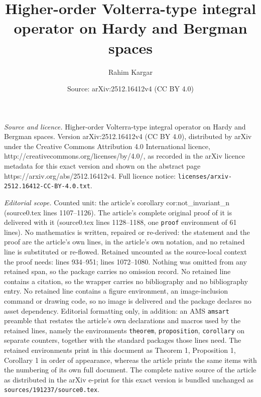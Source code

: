 \documentclass[10pt,a4paper]{amsart}
\title{Higher-order Volterra-type integral operator on Hardy and Bergman spaces}
\author{Rahim Kargar}
\date{Source: arXiv:2512.16412v4 (CC BY 4.0)}
\begin{document}
\maketitle

\noindent\emph{Source and licence.} Higher-order Volterra-type integral operator on Hardy and Bergman spaces. Version arXiv:2512.16412v4 (CC BY 4.0), distributed by arXiv under the Creative Commons Attribution 4.0 International licence, http://creativecommons.org/licenses/by/4.0/, as recorded in the arXiv licence metadata for this exact version and shown on the abstract page https://arxiv.org/abs/2512.16412v4. Full licence notice: \texttt{licenses/arxiv-2512.16412-CC-BY-4.0.txt}.\par\smallskip

\noindent\textit{Editorial scope.} Counted unit: the article's corollary cor:not\_invariant\_n (source0.tex lines 1107--1126). The article's complete original proof of it is delivered with it (source0.tex lines 1128--1188, one \texttt{proof} environment of 61 lines). No mathematics is written, repaired or re-derived: the statement and the proof are the article's own lines, in the article's own notation, and no retained line is substituted or re-flowed.  Retained uncounted as the source-local context the proof needs: lines 934--951; lines 1072--1080.  Nothing was omitted from any retained span, so the package carries no omission record.  No retained line contains a citation, so the wrapper carries no bibliography and no bibliography entry.  No retained line contains a figure environment, an image-inclusion command or drawing code, so no image is delivered and the package declares no asset dependency.  Editorial formatting only, in addition: an AMS \texttt{amsart} preamble that restates the article's own declarations and macros used by the retained lines, namely the environments \texttt{theorem}, \texttt{proposition}, \texttt{corollary} on separate counters, together with the standard packages those lines need.  The retained environments print in this document as Theorem 1, Proposition 1, Corollary 1 in order of appearance, whereas the article prints the same items with the numbering of its own full document.  The complete native source of the article as distributed in the arXiv e-print for this exact version is bundled unchanged as \texttt{sources/191237/source0.tex}.
\end{document}
